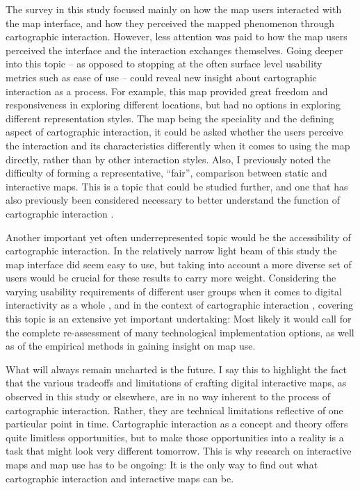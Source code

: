 The survey in this study focused mainly on how the map users interacted with the map interface,
and how they perceived the mapped phenomenon through cartographic interaction.
However, less attention was paid to how the map users perceived
the interface and the interaction exchanges themselves.
Going deeper into this topic --
as opposed to stopping at the often surface level usability metrics such as ease of use --
could reveal new insight about cartographic interaction as a process.
For example, this map provided great freedom and responsiveness in exploring different locations,
but had no options in exploring different representation styles.
The map being the speciality and the defining aspect of cartographic interaction,
it could be asked whether the users perceive the interaction and its characteristics differently when
it comes to using the map directly, rather than by other interaction styles.
Also, I previously noted the difficulty of forming a representative, \enquote{fair},
comparison between static and interactive maps.
This is a topic that could be studied further,
and one that has also previously been considered necessary
to better understand the function of cartographic interaction \parencite{rot2017}.

Another important yet often underrepresented topic would be
the accessibility of cartographic interaction.
In the relatively narrow light beam of this study
the map interface did seem easy to use,
but taking into account a more diverse set of users would be
crucial for these results to carry more weight.
Considering the varying usability requirements of different user groups
when it comes to digital interactivity as a whole \parencite{kul2019},
and in the context of cartographic interaction \parencite{bro2015, duc2018},
covering this topic is an extensive yet important undertaking:
Most likely it would call for the complete re-assessment
of many technological implementation options,
as well as of the empirical methods in gaining insight on map use.

What will always remain uncharted is the future.
I say this to highlight the fact that
the various tradeoffs and limitations of crafting digital interactive maps,
as observed in this study or elsewhere,
are in no way inherent to the process of cartographic interaction.
Rather, they are technical limitations reflective of one particular point in time.
Cartographic interaction as a concept and theory offers quite limitless opportunities,
but to make those opportunities into a reality is a task that
might look very different tomorrow.
This is why research on interactive maps and map use has to be ongoing:
It is the only way to find out what cartographic interaction and interactive maps can be.






